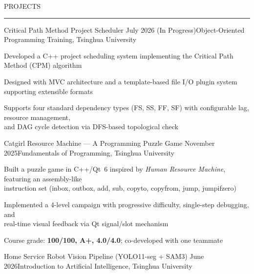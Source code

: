 \documentclass{resume} %
\renewenvironment{rSection}[1]{
\sectionskip
\textcolor{TsinghuaPurple}{\MakeUppercase{#1}}
\sectionlineskip
\hrule
\begin{list}{}{
\setlength{\leftmargin}{0em}
}
\item[]
}{
\end{list}
}
\begin{document}

\begin{rSection}{PROJECTS}

\begin{rSubsection}{Critical Path Method Project Scheduler}
{July 2026 (In Progress)}{Object-Oriented Programming Training, Tsinghua University}{}

\item Developed a C++ project scheduling system implementing the Critical Path Method (CPM) algorithm
\item Designed with MVC architecture and a template-based file I/O plugin system supporting extensible formats
\item Supports four standard dependency types (FS, SS, FF, SF) with configurable lag, resource management, \\and DAG cycle detection via DFS-based topological check

\end{rSubsection}


\begin{rSubsection}{Catgirl Resource Machine --- A Programming Puzzle Game}
{November 2025}{Fundamentals of Programming, Tsinghua University}{}

\item Built a puzzle game in C++/Qt~6 inspired by \textit{Human Resource Machine}, featuring an assembly-like \\instruction set (inbox, outbox, add, sub, copyto, copyfrom, jump, jumpifzero)
\item Implemented a 4-level campaign with progressive difficulty, single-step debugging, and \\real-time visual feedback via Qt signal/slot mechanism
\item Course grade: \textbf{100/100, A+, 4.0/4.0}; co-developed with one teammate

\end{rSubsection}


\begin{rSubsection}{Home Service Robot Vision Pipeline (YOLO11-seg + SAM3)}
{June 2026}{Introduction to Artificial Intelligence, Tsinghua University}{}


\end{rSubsection}
\end{rSection}
\end{document}

